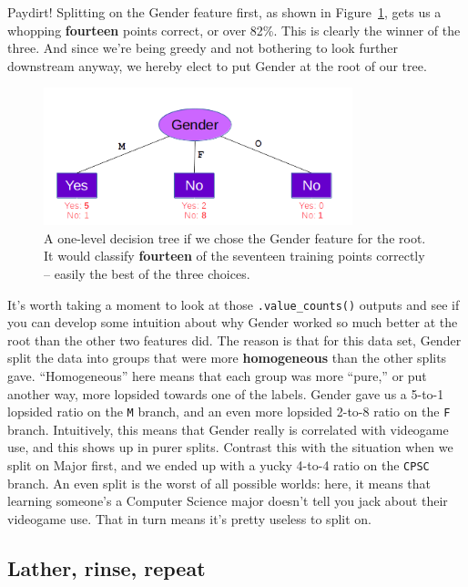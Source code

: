 Paydirt! Splitting on the \textsf{Gender} feature first, as shown in
Figure~\ref{fig:genderOnTop}, gets us a whopping \textbf{fourteen} points
correct, or over 82\%. This is clearly the winner of the three. And since we're
being greedy and not bothering to look further downstream anyway, we hereby
elect to put \textsf{Gender} at the root of our tree.

\begin{figure}[ht]
\centering
\includegraphics[width=0.8\textwidth]{genderOnTop.png}
\caption{A one-level decision tree if we chose the \textsf{Gender} feature for
the root. It would classify \textbf{fourteen} of the seventeen training points
correctly -- easily the best of the three choices.}
\label{fig:genderOnTop}
\end{figure}

It's worth taking a moment to look at those \texttt{.value\_counts()} outputs
and see if you can develop some intuition about why \textsf{Gender} worked so
much better at the root than the other two features did. The reason is that for
this data set, \textsf{Gender} split the data into groups that were more
\textbf{homogeneous} than the other splits gave. ``Homogeneous'' here means
that each group was more ``pure,'' or put another way, more lopsided towards
one of the labels. \textsf{Gender} gave us a 5-to-1 lopsided ratio on the
\texttt{M} branch, and an even more lopsided 2-to-8 ratio on the \texttt{F}
branch. Intuitively, this means that \textsf{Gender} really is correlated with
videogame use, and this shows up in purer splits. Contrast this with the
situation when we split on \textsf{Major} first, and we ended up with a yucky
4-to-4 ratio on the \texttt{CPSC} branch. An even split is the worst of all
possible worlds: here, it means that learning someone's a Computer Science
major doesn't tell you jack about their videogame use. That in turn means it's
pretty useless to split on.

\subsection{Lather, rinse, repeat}

